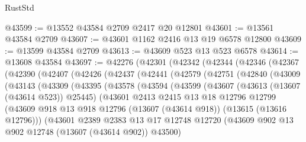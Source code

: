 \begin{lexlean}{RustStd}
\begin{coremodule}
@43599 := @13552 @43584 @2709 @2417 @20 @12801
@43601 := @13561 @43584 @2709
@43607 := @43601 @1162 @2416 @13 @19 @6578 @12800
@43609 := @13599 @43584 @2709
@43613 := @43609 @523 @13 @523 @6578
@43614 := @13608 @43584
@43697 := @42276
    (@42301
      (@42342
        (@42344
          (@42346
            (@42367
              (@42390
                (@42407
                  (@42426
                    (@42437
                      (@42441
                        (@42579
                          (@42751
                            (@42840
                              (@43009
                                (@43143
                                  (@43309
                                    (@43395
                                      (@43578
                                        (@43594
                                          (@43599
                                            (@43607
                                              (@43613 (@13607 (@43614 @523)) @25445)
                                              (@43601
                                                @2413
                                                @2415
                                                @13
                                                @18
                                                @12796
                                                @12799
                                                (@43609
                                                  @918
                                                  @13
                                                  @918
                                                  @12796
                                                  (@13607 (@43614 @918))
                                                  (@13615 (@13616 @12796)))
                                                (@43601
                                                  @2389
                                                  @2383
                                                  @13
                                                  @17
                                                  @12748
                                                  @12720
                                                  (@43609
                                                    @902
                                                    @13
                                                    @902
                                                    @12748
                                                    (@13607 (@43614 @902))
                                                    @43500)

\end{coremodule}
\end{lexlean}
